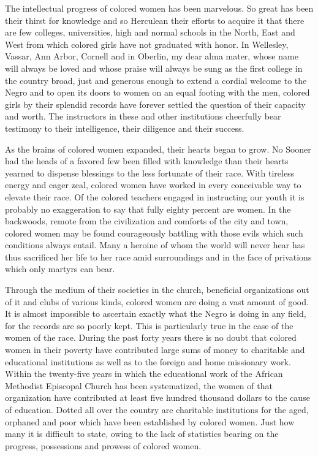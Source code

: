 \documentclass{article}
\begin{document}
The intellectual progress of colored women has been marvelous. So great has
been their thirst for knowledge and so Herculean their efforts to acquire it
that there are few colleges, universities, high and normal schools in the
North, East and West from which colored girls have not graduated with honor. In
Wellesley, Vassar, Ann Arbor, Cornell and in Oberlin, my dear alma mater, whose
name will always be loved and whose praise will always be sung as the first
college in the country broad, just and generous enough to extend a cordial
welcome to the Negro and to open its doors to women on an equal footing with
the men, colored girls by their splendid records have forever settled the
question of their capacity and worth. The instructors in these and other
institutions cheerfully bear testimony to their intelligence, their diligence
and their success.

As the brains of colored women expanded, their hearts began to grow. No Sooner
had the heads of a favored few been filled with knowledge than their hearts
yearned to dispense blessings to the less fortunate of their race. With
tireless energy and eager zeal, colored women have worked in every conceivable
way to elevate their race. Of the colored teachers engaged in instructing our
youth it is probably no exaggeration to say that fully eighty percent are
women. In the backwoods, remote from the civilization and comforts of the city
and town, colored women may be found courageously battling with those evils
which such conditions always entail. Many a heroine of whom the world will
never hear has thus sacrificed her life to her race amid surroundings and in
the face of privations which only martyrs can bear.

Through the medium of their societies in the church, beneficial organizations
out of it and clubs of various kinds, colored women are doing a vast amount of
good. It is almost impossible to ascertain exactly what the Negro is doing in
any field, for the records are so poorly kept. This is particularly true in the
case of the women of the race. During the past forty years there is no doubt
that colored women in their poverty have contributed large sums of money to
charitable and educational institutions as well as to the foreign and home
missionary work. Within the twenty-five years in which the educational work of
the African Methodist Episcopal Church has been systematized, the women of that
organization have contributed at least five hundred thousand dollars to the
cause of education. Dotted all over the country are charitable institutions for
the aged, orphaned and poor which have been established by colored women. Just
how many it is difficult to state, owing to the lack of statistics bearing on
the progress, possessions and prowess of colored women.
\end{document}
